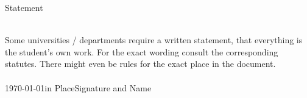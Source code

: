 \thispagestyle{empty}
\begin{center}
{\Large Statement}
\end{center}
\ \\
Some universities / departments require a written statement, that everything is the student's own work. For the exact wording consult the corresponding statutes. There might even be rules for the exact place in the document.\\
\ \\
\today in Place\hfill Signature and Name\\